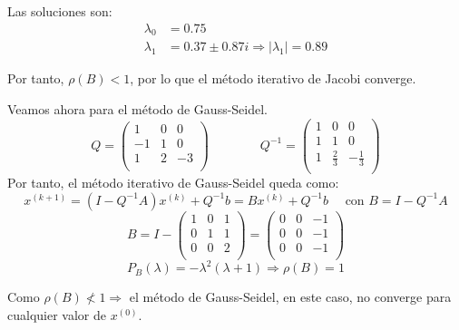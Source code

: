 \begin{ejercicio}
    Las soluciones son:
    \begin{equation*}
        \begin{split}
            \lambda_0&  = 0.75 \\
            \lambda_1 & = 0.37 \pm 0.87i \Longrightarrow |\lambda_1| = 0.89
        \end{split}
    \end{equation*}
     
     Por tanto, $\rho(B)<1$, por lo que el método iterativo de Jacobi converge.

    Veamos ahora para el método de Gauss-Seidel.
    $$Q=\left( \begin{array}{ccc}
        1 & 0 & 0 \\
        -1 & 1 & 0 \\
        1 & 2 & -3 \\
    \end{array} \right)
    \qquad \qquad
    Q^{-1}=\left( \begin{array}{ccc}
        1 & 0 & 0 \\
        1 & 1 & 0 \\
        1 & \frac{2}{3} & -\frac{1}{3} \\
    \end{array} \right)
    $$
    Por tanto, el método iterativo de Gauss-Seidel queda como:
    $$x^{(k+1)} = (I-Q^{-1}A)x^{(k)} + Q^{-1}b 
    =Bx^{(k)} + Q^{-1}b
    \quad \text{ con } B=I-Q^{-1}A$$
    $$B=I-\left( \begin{array}{ccc}
        1 & 0 & 1 \\
        0 & 1 & 1 \\
        0 & 0 & 2 \\
    \end{array} \right)
    = \left( \begin{array}{ccc}
        0 & 0 & -1 \\
        0 & 0 & -1 \\
        0 & 0 & -1 \\
    \end{array} \right)$$
    $$P_B(\lambda)=-\lambda^2(\lambda+1) \Longrightarrow \rho(B)=1$$

    Como $\rho(B)\nless 1 \Longrightarrow$ el método de Gauss-Seidel, en este caso, no converge para cualquier valor de $x^{(0)}$.
\end{ejercicio}

